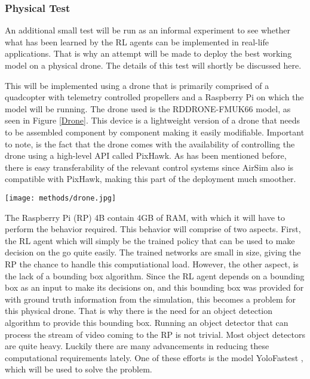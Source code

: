 
\subsubsection{Physical Test}
An additional small test will be run as an informal experiment to see whether what has been 
learned by the RL agents can be implemented in real-life applications. That is why an attempt 
will be made to deploy the best working model on a physical drone. The details of this test 
will shortly be discussed here.

This will be implemented using a drone that is primarily comprised of a quadcopter with 
telemetry controlled propellers and a Raspberry Pi on which the model will be running.
The drone used is the RDDRONE-FMUK66 model, as seen in Figure \ref{Drone}.
This device is a lightweight version of a drone that needs to be assembled component 
by component making it easily modifiable. Important 
to note, is the fact that the drone comes with the availability of controlling the 
drone using a high-level API called PixHawk. As has been mentioned before, there is easy 
transferability of the relevant control systems since AirSim also is compatible with 
PixHawk, making this part of the deployment much smoother. 

\begin{Figure}
    \centering
    \texttt{[image: methods/drone.jpg]}
    \label{Drone}
\end{Figure}

The Raspberry Pi (RP) 4B contain 4GB of RAM, with which it will have to perform the behavior
required. This behavior will comprise of two aspects. First, the RL agent which will simply 
be the trained policy that can be used to make decision on the go quite easily. The trained 
networks are small in size, giving the RP the chance to handle this computiational load. However, 
the other aspect, is the lack of a bounding box algorithm. Since the RL agent depends on a bounding 
box as an input to make its decisions on, and this bounding box was provided for with ground truth 
information from the simulation, this becomes a problem for this physical drone. That is why 
there is the need for an object detection algorithm to provide this bounding box. Running an 
object detector that can process the stream of video coming to the RP is not trivial. Most 
object detectors are quite heavy. Luckily there are many advancements in reducing these computational 
requirements lately. One of these efforts is the model YoloFastest \cite{yolofastest}, which 
will be used to solve the problem. 

